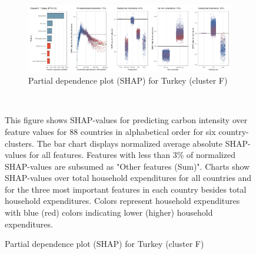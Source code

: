 \begin{figure}[ht!]\ContinuedFloat
    \centering
    \begin{subfigure}[b]{\textwidth}     
    \centering
         \caption{Partial dependence plot (SHAP) for Turkey (cluster F)}
         \label{fig:5b_TUR}
         \includegraphics[width=\textwidth]{Figure 5b/Figure_5b_TUR}     
    \end{subfigure}
    \\
    \vspace{0.5cm}
    \begin{subcaption2}
     This figure shows SHAP-values for predicting carbon intensity over feature values for 88 countries in alphabetical order for six country-clusters. The bar chart displays normalized average absolute SHAP-values for all features. Features with less than 3\% of normalized SHAP-values are subsumed as "Other features (Sum)". Charts show SHAP-values over total household expenditures for all countries and for the three most important features in each country besides total household expenditures. Colors represent household expenditures with blue (red) colors indicating lower (higher) household expenditures.
     \end{subcaption2}
\end{figure}